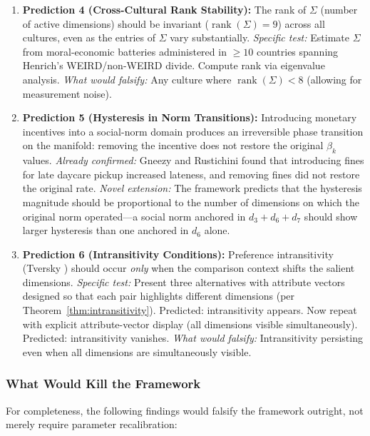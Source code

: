 \documentclass[12pt]{article}
\theoremstyle{definition}
\theoremstyle{remark}
\begin{document}
\begin{enumerate}
    \item \textbf{Prediction 4 (Cross-Cultural Rank Stability):}  The rank of $\Sigma$ (number of active dimensions) should be invariant ($\operatorname{rank}(\Sigma) = 9$) across all cultures, even as the entries of $\Sigma$ vary substantially.  \emph{Specific test:} Estimate $\Sigma$ from moral-economic batteries administered in $\geq 10$ countries spanning Henrich's \cite{henrich2010} WEIRD/non-WEIRD divide.  Compute rank via eigenvalue analysis.  \emph{What would falsify:} Any culture where $\operatorname{rank}(\Sigma) < 8$ (allowing for measurement noise).

    \item \textbf{Prediction 5 (Hysteresis in Norm Transitions):}  Introducing monetary incentives into a social-norm domain produces an irreversible phase transition on the manifold: removing the incentive does not restore the original $\beta_k$ values.  \emph{Already confirmed:} Gneezy and Rustichini \cite{gneezy2000} found that introducing fines for late daycare pickup increased lateness, and removing fines did not restore the original rate.  \emph{Novel extension:} The framework predicts that the hysteresis magnitude should be proportional to the number of dimensions on which the original norm operated---a social norm anchored in $d_3 + d_6 + d_7$ should show larger hysteresis than one anchored in $d_6$ alone.

    \item \textbf{Prediction 6 (Intransitivity Conditions):}  Preference intransitivity (Tversky \cite{tversky1969}) should occur \emph{only} when the comparison context shifts the salient dimensions.  \emph{Specific test:} Present three alternatives with attribute vectors designed so that each pair highlights different dimensions (per Theorem~\ref{thm:intransitivity}).  Predicted: intransitivity appears.  Now repeat with explicit attribute-vector display (all dimensions visible simultaneously).  Predicted: intransitivity vanishes.  \emph{What would falsify:} Intransitivity persisting even when all dimensions are simultaneously visible.
\end{enumerate}

\subsubsection{What Would Kill the Framework}

For completeness, the following findings would falsify the framework outright, not merely require parameter recalibration:
\end{document}
